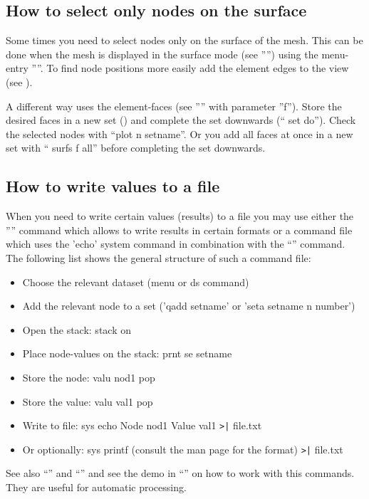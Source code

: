 \documentclass{article}
\begin{document}
\begin{appendix}
\subsection{\label{How to select only nodes on the surface}How to select only nodes on the surface}
Some times you need to select nodes only on the surface of the mesh. This can be done when the mesh is displayed in the surface mode (see '''') using the menu-entry ''''. To find node positions more easily add the element edges to the view (see ).

A different way uses the element-faces (see '''' with parameter ''f''). Store the desired faces in a new set () and complete the set downwards (`` set do''). Check the selected nodes with ``plot n setname''. Or you add all faces at once in a new set with `` surfs f all'' before completing the set downwards.

\subsection{\label{How to write values to a file}How to write values to a file}
When you need to write certain values (results) to a file you may use either the '''' command which allows to write results in certain formats or a command file which uses the 'echo' system command in combination with the ``'' command. The following list shows the general structure of such a command file:
\begin{itemize}
\item Choose the relevant dataset (menu or ds command)
\item Add the relevant node to a set ('qadd setname' or 'seta setname n number') 
\item Open the stack: stack on
\item Place node-values on the stack: prnt se setname
\item Store the node: valu nod1 pop 
\item Store the value: valu val1 pop 
\item Write to file: sys echo Node nod1 Value val1 \verb_>|_ file.txt
\item Or optionally: sys printf (consult the man page for the format) \verb_>|_ file.txt
\end{itemize}
See also ``'' and ``'' and see the demo in ``'' on how to work with this commands. They are useful for automatic processing.


\end{appendix}
\end{document}
